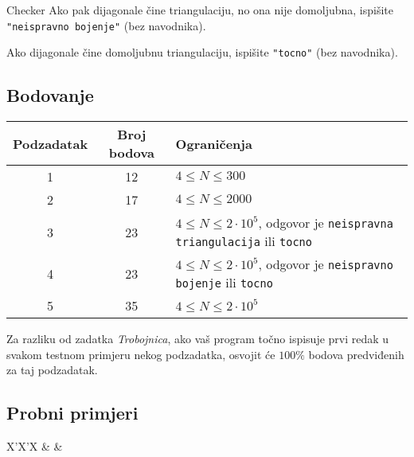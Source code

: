 \begin{statement}[
  problempoints=110,
  timelimit=3 sekunde,
  memorylimit=512 MiB,
]{Checker}
Ako pak dijagonale čine triangulaciju, no ona nije domoljubna, ispišite
\texttt{"neispravno bojenje"} (bez navodnika).

Ako dijagonale čine domoljubnu triangulaciju, ispišite \texttt{"tocno"}
(bez navodnika).

\subsection*{Bodovanje}
{\renewcommand{\arraystretch}{1.4}
  \setlength{\tabcolsep}{6pt}
  \begin{tabular}{ccl}
 Podzadatak & Broj bodova & Ograničenja \\ \midrule
  1 & 12 & $4 \le N \le 300$ \\
  2 & 17 & $4 \le N \le 2000$ \\
    3 & 23 & $4 \le N \le 2\cdot10^5$, odgovor je \texttt{neispravna triangulacija} ili \texttt{tocno} \\
    4 & 23 & $4 \le N \le 2\cdot10^5$, odgovor je \texttt{neispravno bojenje} ili \texttt{tocno} \\
  5 & 35 & $4 \le N \le 2\cdot10^5$
\end{tabular}}

Za razliku od zadatka \textit{Trobojnica}, ako vaš program točno ispisuje prvi redak u
svakom testnom primjeru nekog podzadatka, osvojit će $100\%$ bodova predviđenih
za taj podzadatak.

\subsection*{Probni primjeri}
\begin{tabularx}{\textwidth}{X'X'X}
 &
 &
\end{tabularx}

\end{statement}

